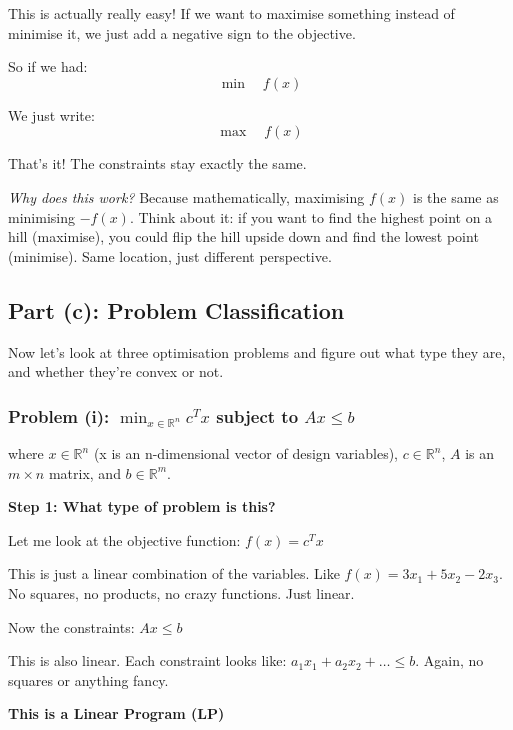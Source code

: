 \documentclass[11pt]{article}
\newenvironment{answerbox}
  {\begin{framed}\begin{center}\large\bfseries}
  {\end{center}\end{framed}}
\begin{document}
This is actually really easy! If we want to maximise something instead of minimise it, we just add a negative sign to the objective.

So if we had:
\begin{equation*}
\min \quad f(x)
\end{equation*}

We just write:
\begin{equation*}
\max \quad f(x)
\end{equation*}

That's it! The constraints stay exactly the same.

\vspace{0.5em}

\textit{Why does this work?} Because mathematically, maximising $f(x)$ is the same as minimising $-f(x)$. Think about it: if you want to find the highest point on a hill (maximise), you could flip the hill upside down and find the lowest point (minimise). Same location, just different perspective.

\subsection{Part (c): Problem Classification}

Now let's look at three optimisation problems and figure out what type they are, and whether they're convex or not.

\subsubsection{Problem (i): $\min_{x \in \mathbb{R}^n} c^T x$ subject to $Ax \leq b$}

where $x \in \mathbb{R}^n$ (x is an n-dimensional vector of design variables), $c \in \mathbb{R}^n$, $A$ is an $m \times n$ matrix, and $b \in \mathbb{R}^m$.

\textbf{Step 1: What type of problem is this?}

Let me look at the objective function: $f(x) = c^T x$

This is just a linear combination of the variables. Like $f(x) = 3x_1 + 5x_2 - 2x_3$. No squares, no products, no crazy functions. Just linear.

Now the constraints: $Ax \leq b$

This is also linear. Each constraint looks like: $a_1 x_1 + a_2 x_2 + \ldots \leq b$. Again, no squares or anything fancy.

\begin{answerbox}
This is a \textbf{Linear Program (LP)}
\end{answerbox}
\end{document}

